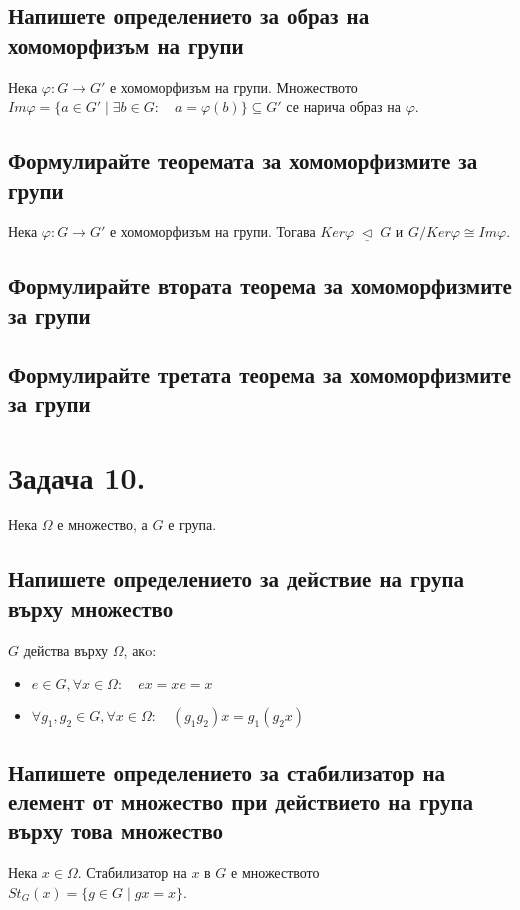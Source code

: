 \documentclass[12pt]{article}
\newcommand{\triq}{\; \underline{\triangleleft} \;}
\begin{document}
\subsection*{Напишете определението за образ на хомоморфизъм на групи}
Нека $\varphi: G \to G'$ е хомоморфизъм на групи. Множеството $Im\varphi = \{a \in G' \mid \exists b \in G: \quad a = \varphi(b)\} \subseteq G'$ се нарича образ на $\varphi$.

\subsection*{Формулирайте теоремата за хомоморфизмите за групи}
Нека $\varphi: G \to G'$ е хомоморфизъм на групи. Тогава $Ker\varphi \triq G$ и $G/Ker\varphi \cong Im\varphi$.

\subsection*{Формулирайте втората теорема за хомоморфизмите за групи}
\subsection*{Формулирайте третата теорема за хомоморфизмите за групи}

\section*{Задача 10.}
Нека $\Omega$ е множество, а $G$ е група.

\subsection*{Напишете определението за действие на група върху множество}
$G$ действа върху $\Omega$, акo:
\begin{itemize}
	\item $ e \in G, \forall x \in \Omega: \quad ex = xe = x$
	\item $\forall g_1, g_2 \in G, \forall x \in \Omega: \quad (g_1g_2)x = g_1(g_2x)$
\end{itemize}

\subsection*{Напишете определението за стабилизатор на елемент от множество при действието на група върху това множество}
Нека $x \in \Omega$. Стабилизатор на $x$ в $G$ е множеството\\ $St_G(x) = \{g \in G \mid gx = x\}$.
\end{document}
